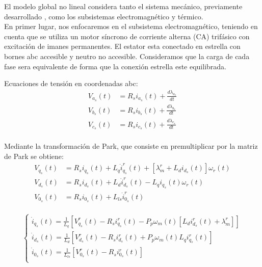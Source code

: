 \documentclass{article}
\begin{document}
El modelo global no lineal considera tanto el sistema mecánico, previamente desarrollado
, como los subsistemas electromagnético y térmico.\\

En primer lugar, nos enfocaremos en el subsistema electromagnético, teniendo en cuenta que 
se utiliza un motor síncrono de corriente alterna (CA) trifásico con excitación de imanes 
permanentes. El estator esta conectado en estrella con bornes abc accesible y neutro no accesible.
Consideramos que la carga de cada fase sera equivalente de forma que la conexión estrella este equilibrada.

Ecuaciones de tensión en coordenadas abc:
\begin{equation}
    \begin{aligned}
        V_{a_{s}}(t) &= R_{s}i_{a_{s}}(t) + \frac{d\lambda_{a_{s}}}{dt}\\
        V_{b_{s}}(t) &= R_{s}i_{b_{s}}(t) + \frac{d\lambda_{b_{s}}}{dt}\\
        V_{c_{s}}(t) &= R_{s}i_{c_{s}}(t) + \frac{d\lambda_{c_{s}}}{dt}\\
    \end{aligned}
\end{equation}

Mediante la transformación de Park, que consiste en premultiplicar por la matriz de Park se obtiene:
\begin{equation}
    \begin{aligned}
        V_{q_{s}}(t) &= R_{s}i_{q_{s}}(t) + L_{q}\dot{i}_{q_{s}}^r(t) + [\lambda_{m}^r + L_{d}i_{d_{s}}(t)]\omega_{r}(t)\\
        V_{d_{s}}(t) &= R_{s}i_{d_{s}}(t) + L_{d}\dot{i}_{d_{s}}^r(t)  - L_{q}i_{q_{s}}(t)\omega_{r}(t)\\
        V_{0_{s}}(t) &= R_{s}i_{0_{s}}(t) + L_{ls}\dot{i}_{0_{s}}^r(t) \\
    \end{aligned}
\end{equation}

\begin{equation}
    \begin{cases}
        \dot{i}_{q_{s}}(t) = \frac{1}{L_{q}}[V_{q_{s}}^r(t) - R_{s}i_{q_{s}}^r(t) - P_{p}\omega_{m}(t)[L_{d}i_{d_{s}}^r(t)+\lambda_{m}^r]]  \\
        \dot{i}_{d_{s}}(t) = \frac{1}{L_{d}}[V_{d_{s}}^r(t) - R_{s}i_{d_{s}}^r(t) + P_{p}\omega_{m}(t)L_{q}i_{q_{s}}^r(t)]  \\
        \dot{i}_{0_{s}}(t) = \frac{1}{L_{ls}}[V_{0_{s}}^r(t) - R_{s}i_{0_{s}}^r(t)]  \\
    \end{cases}
\end{equation}
\end{document}
